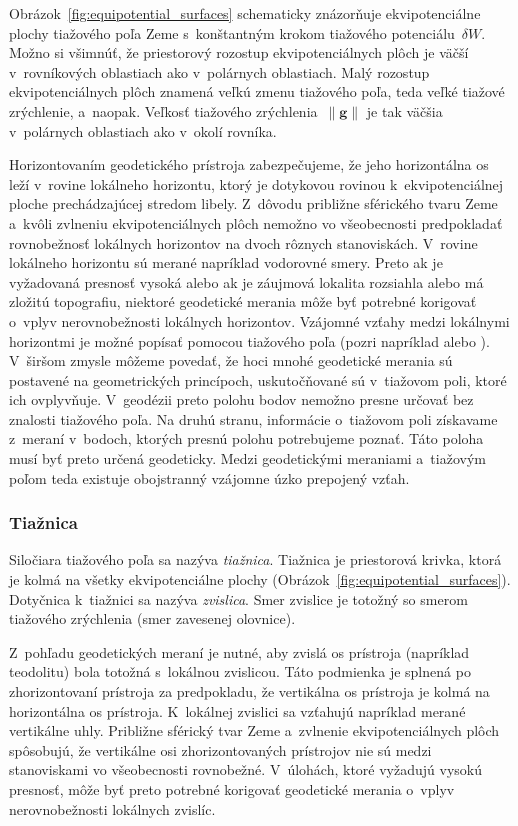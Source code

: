 \documentclass[a4paper, 12pt]{book}
\let\vec\mathbf
\begin{document}
Obrázok~\ref{fig:equipotential_surfaces} schematicky znázorňuje ekvipotenciálne 
plochy tiažového poľa Zeme s~konštantným krokom tiažového potenciálu~$\delta 
W$.  Možno si všimnúť, že priestorový rozostup ekvipotenciálnych plôch je väčší 
v~rovníkových oblastiach ako v~polárnych oblastiach.  Malý rozostup 
ekvipotenciálnych plôch znamená veľkú zmenu tiažového poľa, teda veľké tiažové 
zrýchlenie, a~naopak.  Veľkosť tiažového zrýchlenia~$\| \vec g \|$ je tak 
väčšia v~polárnych oblastiach ako v~okolí rovníka.

Horizontovaním geodetického prístroja zabezpečujeme, že jeho horizontálna os 
leží v~rovine lokálneho horizontu, ktorý je dotykovou rovinou 
k~ekvipotenciálnej ploche prechádzajúcej stredom libely.  Z~dôvodu približne 
sférického tvaru Zeme a~kvôli zvlneniu ekvipotenciálnych plôch nemožno vo 
všeobecnosti predpokladať rovnobežnosť lokálnych horizontov na dvoch rôznych 
stanoviskách.  V~rovine lokálneho horizontu sú merané napríklad vodorovné 
smery.  Preto ak je vyžadovaná presnosť vysoká alebo ak je záujmová lokalita 
rozsiahla alebo má zložitú topografiu, niektoré geodetické merania môže byť 
potrebné korigovať o~vplyv nerovnobežnosti lokálnych horizontov.  Vzájomné 
vzťahy medzi lokálnymi horizontmi je možné popísať pomocou tiažového poľa 
(pozri napríklad \cite{VanicekGeodesy} alebo \cite{MoritzPhysicalGeodesy}).  
V~širšom zmysle môžeme povedať, že hoci mnohé geodetické merania sú postavené 
na geometrických princípoch, uskutočňované sú v~tiažovom poli, ktoré ich 
ovplyvňuje.  V~geodézii preto polohu bodov nemožno presne určovať bez znalosti 
tiažového poľa.  Na druhú stranu, informácie o~tiažovom poli získavame z~meraní 
v~bodoch, ktorých presnú polohu potrebujeme poznať.  Táto poloha musí byť preto 
určená geodeticky.  Medzi geodetickými meraniami a~tiažovým poľom teda existuje 
obojstranný vzájomne úzko prepojený vzťah.

\subsubsection{Tiažnica}
\label{sec:plumbline}

Siločiara tiažového poľa sa nazýva \emph{tiažnica}.  Tiažnica je priestorová 
krivka, ktorá je kolmá na všetky ekvipotenciálne plochy 
(Obrázok~\ref{fig:equipotential_surfaces}).  Dotyčnica k~tiažnici sa nazýva 
\emph{zvislica}.  Smer zvislice je totožný so smerom tiažového zrýchlenia (smer 
zavesenej olovnice).

Z~pohľadu geodetických meraní je nutné, aby zvislá os prístroja (napríklad 
teodolitu) bola totožná s~lokálnou zvislicou.  Táto podmienka je splnená po 
zhorizontovaní prístroja za predpokladu, že vertikálna os prístroja je kolmá na 
horizontálna os prístroja.  K~lokálnej zvislici sa vzťahujú napríklad merané 
vertikálne uhly.  Približne sférický tvar Zeme a~zvlnenie ekvipotenciálnych 
plôch spôsobujú, že vertikálne osi zhorizontovaných prístrojov nie sú medzi 
stanoviskami vo všeobecnosti rovnobežné.  V~úlohách, ktoré vyžadujú vysokú 
presnosť, môže byť preto potrebné korigovať geodetické merania o~vplyv 
nerovnobežnosti lokálnych zvislíc.
\end{document}
